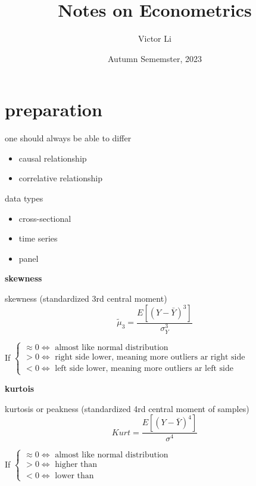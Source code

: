 \documentclass{article}
\title{Notes on Econometrics}
\author{Victor Li}
\date{Autumn Sememster, 2023}
\providecommand{\tightlist}{
  \setlength{\itemsep}{0pt}
  \setlength{\parskip}{0pt}}
\begin{document}
\maketitle

\newpage
\tableofcontents


\newpage
\section{preparation}

one should always be able to differ
\begin{itemize}
\tightlist
  \item causal relationship
  \item correlative relationship
\end{itemize}

data types
\begin{itemize}
\tightlist
  \item cross-sectional
  \item time series
  \item panel
\end{itemize}

\textbf{skewness}

skewness (standardized 3rd central moment)
\begin{equation}
  \tilde \mu_3=\frac{E[(Y-\bar Y)^3]}{\sigma^3_Y}
\end{equation}

If
$\begin{cases}
  \approx 0 \iff \text{ almost like normal distribution}
  \\
  >0 \iff \text{ right side lower, meaning more outliers ar right side}
  \\
  <0 \iff \text{ left side lower, meaning more outliers ar left side}
\end{cases}$

\textbf{kurtois}  

kurtosis or peakness (standardized 4rd central moment of samples)
\begin{equation}
  Kurt=\frac{E[(Y-\bar Y)^4]}{\sigma^4}
\end{equation}

If 
$\begin{cases}
  \approx 0 \iff \text{ almost like normal distribution}
  \\
  >0 \iff \text{ higher than}
  \\
  <0 \iff \text{ lower than}
\end{cases}$
\end{document}
